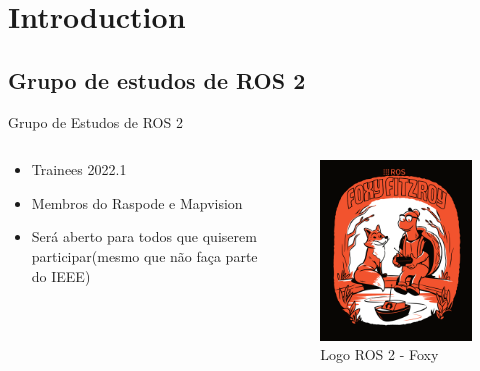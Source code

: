\section{Introduction}

\subsection*{Grupo de estudos de ROS 2}
\begin{frame}{Grupo de Estudos de ROS 2}
    \begin{columns}
        \begin{column}{0.6\textwidth}
            \begin{itemize}
                \item Trainees 2022.1
                \item Membros do Raspode e Mapvision
                \item Será aberto para todos que quiserem participar(mesmo que não faça parte do IEEE)
            \end{itemize}
        \end{column}

        \begin{column}{0.4\textwidth}
            \begin{figure}
                \centering
                \includegraphics[height = 0.6\textheight]{img/ros2-foxy.png}
                \caption{Logo ROS 2 - Foxy}
            \end{figure}
        \end{column}

    \end{columns}
\end{frame}

